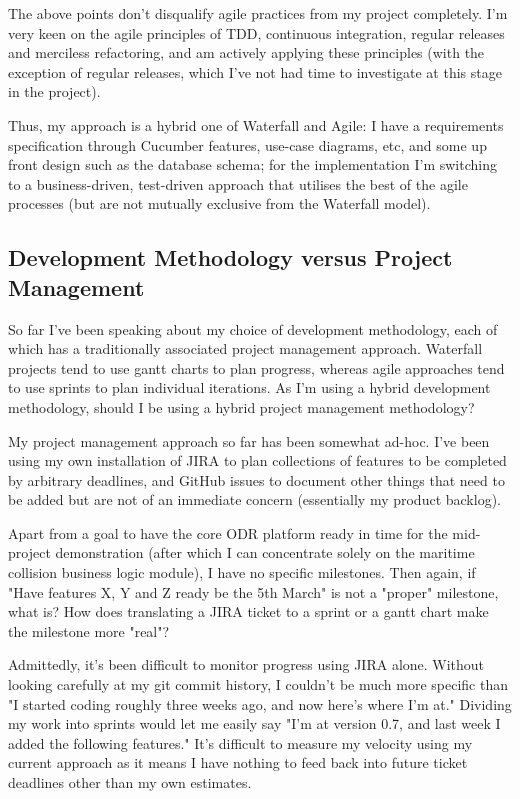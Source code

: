 The above points don't disqualify agile practices from my project completely. I'm very keen on the agile principles of TDD, continuous integration, regular releases and merciless refactoring, and am actively applying these principles (with the exception of regular releases, which I've not had time to investigate at this stage in the project).

Thus, my approach is a hybrid one of Waterfall and Agile: I have a requirements specification through Cucumber features, use-case diagrams, etc, and some up front design such as the database schema; for the implementation I'm switching to a business-driven, test-driven approach that utilises the best of the agile processes (but are not mutually exclusive from the Waterfall model).

\subsection{Development Methodology versus Project Management}

So far I've been speaking about my choice of development methodology, each of which has a traditionally associated project management approach. Waterfall projects tend to use gantt charts to plan progress, whereas agile approaches tend to use sprints to plan individual iterations. As I'm using a hybrid development methodology, should I be using a hybrid project management methodology?

My project management approach so far has been somewhat ad-hoc. I've been using my own installation of JIRA to plan collections of features to be completed by arbitrary deadlines, and GitHub issues to document other things that need to be added but are not of an immediate concern (essentially my product backlog).

Apart from a goal to have the core ODR platform ready in time for the mid-project demonstration (after which I can concentrate solely on the maritime collision business logic module), I have no specific milestones. Then again, if "Have features X, Y and Z ready be the 5th March" is not a "proper" milestone, what is? How does translating a JIRA ticket to a sprint or a gantt chart make the milestone more "real"?

Admittedly, it's been difficult to monitor progress using JIRA alone. Without looking carefully at my git commit history, I couldn't be much more specific than "I started coding roughly three weeks ago, and now here's where I'm at." Dividing my work into sprints would let me easily say "I'm at version 0.7, and last week I added the following features." It's difficult to measure my velocity using my current approach as it means I have nothing to feed back into future ticket deadlines other than my own estimates.

